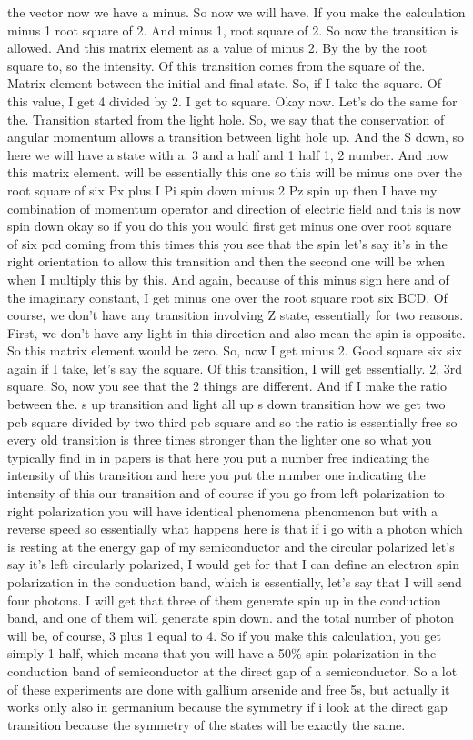 the vector now we have a minus. So now we will have. If you make the calculation minus 1 root square of 2. And minus 1, root square of 2. So now the transition is allowed. And this matrix element as a value of minus 2. By the by the root square to, so the intensity. Of this transition comes from the square of the. Matrix element between the initial and final state. So, if I take the square. Of this value, I get 4 divided by 2. I get to square. Okay now. Let's do the same for the. Transition started from the light hole. So, we say that the conservation of angular momentum allows a transition between light hole up. And the S down, so here we will have a state with a. 3 and a half and 1 half 1, 2 number. And now this matrix element. will be essentially this one so this will be minus one over the root square of six Px plus I Pi spin down minus 2 Pz spin up then I have my combination of momentum operator and direction of electric field and this is now spin down okay so if you do this you would first get minus one over root square of six pcd coming from this times this you see that the spin let's say it's in the right orientation to allow this transition and then the second one will be when when I multiply this by this. And again, because of this minus sign here and of the imaginary constant, I get minus one over the root square root six BCD. Of course, we don't have any transition involving Z state, essentially for two reasons. First, we don't have any light in this direction and also mean the spin is opposite. So this matrix element would be zero. So, now I get minus 2. Good square six six again if I take, let's say the square. Of this transition, I will get essentially. 2, 3rd square. So, now you see that the 2 things are different. And if I make the ratio between the. s up transition and light all up s down transition how we get two pcb square divided by two third pcb square and so the ratio is essentially free so every old transition is three times stronger than the lighter one so what you typically find in in papers is that here you put a number free indicating the intensity of this transition and here you put the number one indicating the intensity of this our transition and of course if you go from left polarization to right polarization you will have identical phenomena phenomenon but with a reverse speed so essentially what happens here is that if i go with a photon which is resting at the energy gap of my semiconductor and the circular polarized let's say it's left circularly polarized, I would get for that I can define an electron spin polarization in the conduction band, which is essentially, let's say that I will send four photons. I will get that three of them generate spin up in the conduction band, and one of them will generate spin down. and the total number of photon will be, of course, 3 plus 1 equal to 4. So if you make this calculation, you get simply 1 half, which means that you will have a 50\% spin polarization in the conduction band of semiconductor at the direct gap of a semiconductor. So a lot of these experiments are done with gallium arsenide and free 5s, but actually it works only also in germanium because the symmetry if i look at the direct gap transition because the symmetry of the states will be exactly the same.
